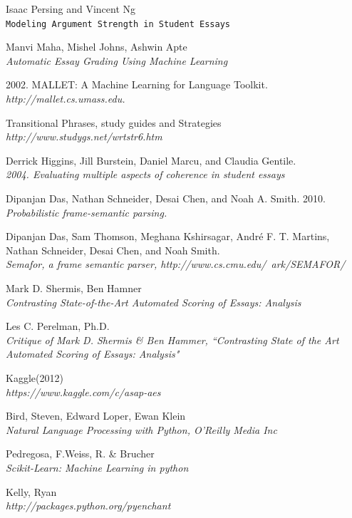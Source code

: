 \documentclass[BTech]{nitkdiss}
\begin{document}
\begin{thebibliography}{9}
Isaac Persing and Vincent Ng
\\\texttt{Modeling Argument Strength in Student Essays}

Manvi Maha, Mishel Johns, Ashwin Apte
\\\textit{Automatic Essay Grading Using Machine Learning}

2002. MALLET: A Machine Learning for Language Toolkit.
\\\textit{http://mallet.cs.umass.edu.}

Transitional Phrases, study guides and Strategies
\\\textit{http://www.studygs.net/wrtstr6.htm}

Derrick Higgins, Jill Burstein, Daniel Marcu, and Claudia Gentile.
\\\textit{2004. Evaluating multiple aspects of coherence in student essays}

Dipanjan Das, Nathan Schneider, Desai Chen, and Noah A. Smith. 2010.
\\\textit{Probabilistic frame-semantic parsing.}

Dipanjan Das, Sam Thomson, Meghana Kshirsagar, André F. T. Martins, Nathan Schneider, Desai Chen, and Noah Smith. 
\\\textit{Semafor, a frame semantic parser, http://www.cs.cmu.edu/~ark/SEMAFOR/}

Mark D. Shermis, Ben Hamner
\\\textit{Contrasting State-of-the-Art Automated Scoring of Essays: Analysis}

Les C. Perelman, Ph.D.
\\\textit{Critique of Mark D. Shermis \& Ben Hammer, “Contrasting State of the Art Automated Scoring of Essays: Analysis"}

Kaggle(2012)
\\\textit{https://www.kaggle.com/c/asap-aes}

Bird, Steven, Edward Loper, Ewan Klein
\\\textit{Natural Language Processing with Python, O'Reilly Media Inc}

Pedregosa, F.Weiss, R. \& Brucher
\\\textit{Scikit-Learn: Machine Learning in python}

Kelly, Ryan 
\\\textit{http://packages.python.org/pyenchant}
\end{thebibliography}
\end{document}
